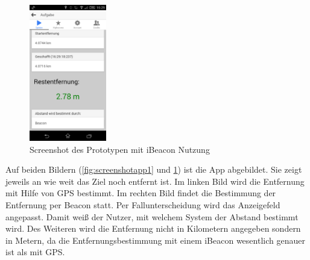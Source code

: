 \begin{figure}[ht]
\centering
\includegraphics[width=0.3\textwidth]{ref/images/screenshot2.png}
\caption[Screenshot des Prototypen mit iBeacon Nutzung]{Screenshot des Prototypen mit iBeacon Nutzung}
\label{fig:screenshotapp2}
\end{figure} 
Auf beiden Bildern (\ref{fig:screenshotapp1} und \ref{fig:screenshotapp2}) ist die App abgebildet. Sie zeigt jeweils an wie weit das Ziel noch entfernt ist. Im linken Bild wird die Entfernung mit Hilfe von GPS bestimmt. Im rechten Bild findet die Bestimmung der Entfernung per Beacon statt.
Per Fallunterscheidung wird das Anzeigefeld angepasst. Damit weiß der Nutzer, mit welchem System der Abstand bestimmt wird. Des Weiteren wird die Entfernung nicht in Kilometern angegeben sondern in Metern, da die Entfernungsbestimmung mit einem iBeacon wesentlich genauer ist als mit GPS.

